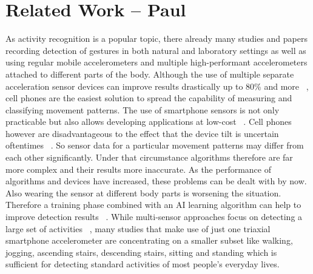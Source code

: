 \documentclass[conference]{IEEEtran}
\begin{document}
\section{Related Work -- Paul}
As activity recognition is a popular topic, there already many studies and papers recording detection of gestures in both natural and laboratory settings as well as using regular mobile accelerometers and multiple high-performant accelerometers attached to different parts of the body.
Although the use of multiple separate acceleration sensor devices can improve results drastically up to 80\% and more ~\cite{Bao2004}, cell phones are the easiest solution to spread the capability of measuring and classifying movement patterns. 
The use of smartphone sensors is not only practicable but also allows developing applications at low-cost ~\cite{Brezmes2009}.
Cell phones however are disadvantageous to the effect that the device tilt is uncertain oftentimes ~\cite{Brezmes2009}. So sensor data for a particular movement patterns may differ from each other significantly. Under that circumstance algorithms therefore are far more complex and their results more inaccurate. As the performance of algorithms and devices have increased, these problems can be dealt with by now. Also wearing the sensor at different body parts is worsening the situation. Therefore a training phase combined with an AI learning algorithm can help to improve detection results ~\cite{Kwapisz2011,Bao2004}.
While multi-sensor approaches focus on detecting a large set of activities ~\cite{Bao2004}, many studies that make use of just one triaxial smartphone accelerometer are concentrating on a smaller subset like walking, jogging, ascending stairs, descending stairs, sitting and standing which is sufficient for detecting standard activities of most people's everyday lives.
\end{document}
